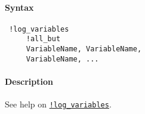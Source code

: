 


	\paragraph{Syntax}
 
 \begin{verbatim}
 !log_variables
     !all_but
     VariableName, VariableName, 
     VariableName, ...
 \end{verbatim}
 
 \paragraph{Description}
 
 See help on \href{modellang/logvariables}{\texttt{!log\_variables}}.


